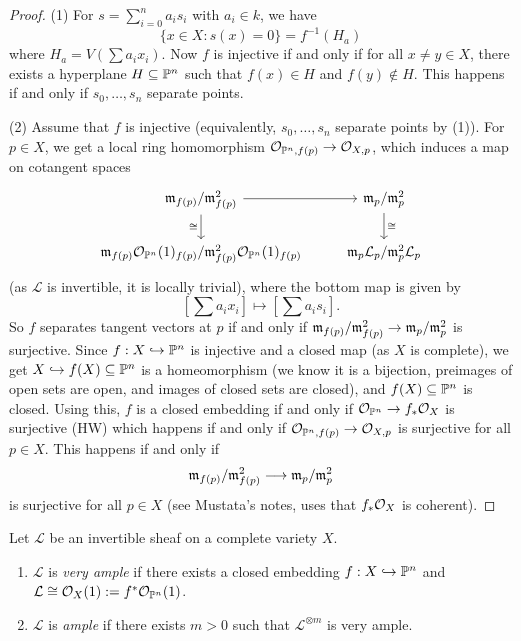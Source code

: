\begin{proof}
  (1) For $s = \sum_{i = 0}^n a_i s_i$
  with $a_i \in k$, we have
  \[
    \{x \in X : s(x) = 0\}
    = f^{-1}(H_a)
  \]
  where $H_a = V(\sum a_i x_i)$. Now
  $f$ is injective if and only if
  for all $x \ne y \in X$, there exists
  a hyperplane $H \subseteq \mathbb{P}^n$ such that
  $f(x) \in H$ and $f(y) \not\in H$. This
  happens if and only if
  $s_0, \dots, s_n$ separate points.

  (2) Assume that $f$ is injective 
  (equivalently, $s_0, \dots, s_n$ separate points by (1)).
  For $p \in X$, we get a local ring
  homomorphism
  $\mathcal{O}_{\mathbb{P}^n, f(p)} \to \mathcal{O}_{X, p}$,
  which induces a map on cotangent spaces
  \[
    \begin{tikzcd}
      \m_{f(p)} / \m_{f(p)}^2
      \arrow[r] \arrow[d, "\cong", swap] &
      \m_p / \m_p^2 \arrow[d, "\cong"] \\
      \m_{f(p)} \OO_{\PP^n}(1)_{f(p)} / \m^2_{f(p)} \OO_{\PP^n}(1)_{f(p)} &
      \m_p \mathcal{L}_p / \m_p^2 \mathcal{L}_p
    \end{tikzcd}
  \]
  (as $\mathcal{L}$ is invertible, it is
  locally trivial), where the bottom map
  is given by
  \[
    \left[\sum {a_i x_i}\right]
    \longmapsto \left[\sum a_i s_i\right].
  \]
  So $f$ separates tangent
  vectors at $p$ if and only if
  $\mathfrak{m}_{f(p)} / \mathfrak{m}_{f(p)}^2 \to \mathfrak{m}_p / \mathfrak{m}_p^2$
  is surjective. Since
  $f : X \hookrightarrow \mathbb{P}^n$ is injective
  and a closed map (as $X$ is complete),
  we get $X \hookrightarrow f(X) \subseteq \mathbb{P}^n$ is a
  homeomorphism (we know it is a bijection,
  preimages of open sets are open, and
  images of closed sets are closed), and
  $f(X) \subseteq \mathbb{P}^n$ is
  closed. Using this, $f$ is a
  closed embedding if and only if
  $\mathcal{O}_{\mathbb{P}^n} \to f_* \mathcal{O}_X$ is
  surjective (HW) which happens if and only
  if $\mathcal{O}_{\mathbb{P}^n, f(p)} \to \mathcal{O}_{X, p}$ is
  surjective for all $p \in X$. This
  happens if and only if
  \[
    \mathfrak{m}_{f(p)} / \mathfrak{m}_{f(p)}^2
    \longrightarrow \mathfrak{m}_p / \mathfrak{m}_p^2
  \]
  is surjective for all $p \in X$
  (see Mustata's notes, uses that
  $f_* \mathcal{O}_X$ is coherent).
\end{proof}

\begin{definition}
  Let $\mathcal{L}$ be an invertible sheaf
  on a complete variety $X$.
  \begin{enumerate}
    \item $\mathcal{L}$ is
      \emph{very ample} if there exists
      a closed embedding
      $f : X \hookrightarrow \mathbb{P}^n$
      and $\mathcal{L} \cong \mathcal{O}_X(1) := f^* \mathcal{O}_{\mathbb{P}^n}(1)$.
    \item $\mathcal{L}$ is
      \emph{ample} if there exists $m > 0$ 
      such that $\mathcal{L}^{\otimes m}$
      is very ample.
  \end{enumerate}
\end{definition}

